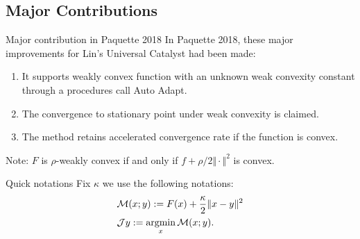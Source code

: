 \documentclass[11pt]{beamer}
\begin{document}
    \subsection{Major Contributions}
        \begin{frame}{Major contribution in Paquette 2018}
            In Paquette 2018, these major improvements for Lin's Universal Catalyst had been made: 
            \begin{enumerate}
                \item It supports weakly convex function with an unknown weak convexity constant through a procedures call Auto Adapt. 
                \item The convergence to stationary point under weak convexity is claimed. 
                \item The method retains accelerated convergence rate if the function is convex. 
            \end{enumerate}
            Note: $F$ is $\rho$-weakly convex if and only if $f + \rho/2\Vert \cdot\Vert^2$ is convex. 
            \begin{block}{Quick notations}
                Fix $\kappa$ we use the following notations: 
                \begin{align*}
                & \mathcal M (x; y) := F(x) + \frac{\kappa}{2}\Vert x - y\Vert^2 
                \\
                & \mathcal J y := \mathop{\rm argmin}\limits_x \mathcal M (x; y). 
                \end{align*}
            \end{block}
        \end{frame}
\end{document}
